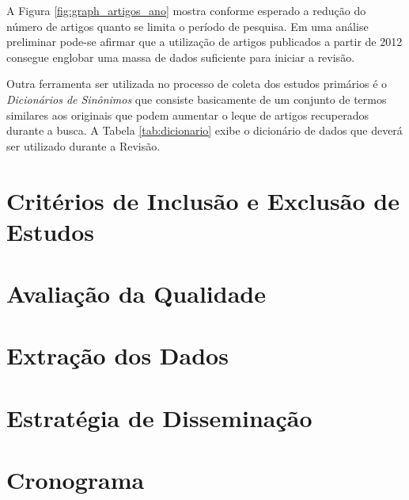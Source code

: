 \documentclass{article}
\begin{document}
A Figura \ref{fig:graph_artigos_ano} mostra conforme esperado a
redução do número de artigos quanto se limita o período de
pesquisa. Em uma análise preliminar pode-se afirmar que a utilização
de artigos publicados a partir de 2012 consegue englobar uma massa de
dados suficiente para iniciar a revisão.

Outra ferramenta ser utilizada no processo de coleta dos estudos primários é o
\textit{Dicionários de Sinônimos} que consiste basicamente de um conjunto de
termos similares aos originais que podem aumentar o leque de artigos
recuperados durante a busca. A Tabela \ref{tab:dicionario} exibe o dicionário de dados que deverá ser utilizado durante a Revisão.

\begin{table}[]
\centering
{}
\caption{Dicionário de Sinônimos}
\label{tab:dicionario}
\end{table}


\section{Critérios de Inclusão e Exclusão de Estudos}
\label{sec:criterios_in_out}

\section{Avaliação da Qualidade}
\label{sec:qualidade}

\section{Extração dos Dados}
\label{sec:extracao_dados}

\section{Estratégia de Disseminação}
\label{sec:dissiminacao}

\section{Cronograma}
\label{sec:cronograma}

\medskip

\end{document}
